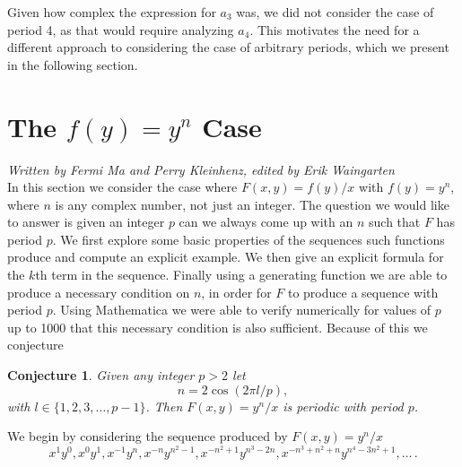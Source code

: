 \documentclass[12pt]{article}
\newtheorem{conjecture}{Conjecture}
\begin{document}
Given how complex the expression for $a_3$ was, we did not consider the case of period 4, as that would require analyzing $a_4$. This motivates the need for a different approach to considering the case of arbitrary periods, which we present in the following section.

\section{The $f(y) = y^n$ Case}
\label{general case}

\emph{Written by Fermi Ma and Perry Kleinhenz, edited by Erik Waingarten}\\

In this section we consider the case where $F(x,y) = f(y)/x$ with $f(y) = y^n$, where $n$ is any complex number, not just an integer. The question we would like to answer is given an integer $p$ can we always come up with an $n$ such that $F$ has period $p$. We first explore some basic properties of the sequences such functions produce and compute an explicit example. We then give an explicit formula for the $k$th term in the sequence. Finally using a generating function we are able to produce a necessary condition on $n$, in order for $F$ to produce a sequence with period $p$. Using Mathematica we were able to verify numerically for values of $p$ up to 1000 that this necessary condition is also sufficient. Because of this we conjecture 

\begin{conjecture}
\label{cos}
Given any integer $p>2$ let 
\begin{equation*}
n = 2 \cos(2 \pi l/p),
\end{equation*}
with $l \in \{1,2,3, \ldots, p-1 \}$. Then $F(x,y) = y^n/x$ is periodic with period $p$.
\end{conjecture}

We begin by considering the sequence produced by $F(x,y) = y^n/x$ 
\begin{equation}
\label{exponents}
x^1y^0, x^0y^1, x^{-1}y^{n}, x^{-n}y^{n^2-1}, x^{-n^2+1}y^{n^3-2n},x^{-n^3+n^2+n}y^{n^4-3n^2+1}, \dots \,.
\end{equation}
\end{document}
